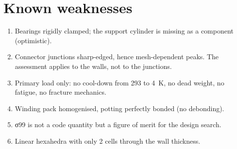 \documentclass[10pt,a4paper]{article}
\begin{document}
\section{Known weaknesses}
\begin{enumerate}[itemsep=1pt]
\item Bearings rigidly clamped; the support cylinder is missing as a component (optimistic).
\item Connector junctions sharp-edged, hence mesh-dependent peaks. The assessment applies to the walls, not to the
junctions.
\item Primary load only: no cool-down from \SI{293}{} to \SI{4}{K}, no dead weight, no fatigue, no fracture mechanics.
\item Winding pack homogenised, potting perfectly bonded (no debonding).
\item σ99 is not a code quantity but a figure of merit for the design search.
\item Linear hexahedra with only 2 cells through the wall thickness.
\end{enumerate}
\end{document}
